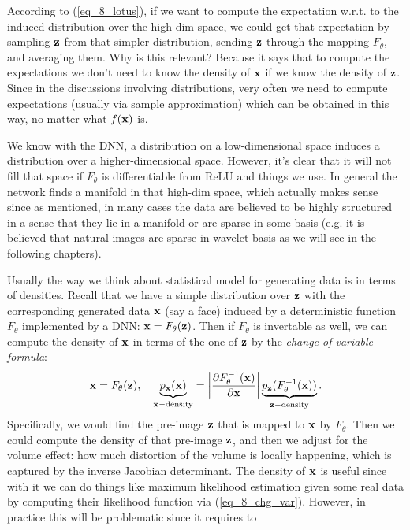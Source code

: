 \documentclass[../book-template.tex]{subfiles}
\begin{document}
According to (\ref{eq_8_lotus}), if we want to compute the expectation w.r.t. to the induced distribution over the high-dim space, we could get that expectation by sampling ${\bf z}$ from that simpler distribution, sending ${\bf z}$ through the mapping $F_{\theta}$, and averaging them. Why is this relevant? Because it says that to compute the expectations we don't need to know the density of ${\bf x}$ if we know the density of ${\bf z}$. Since in the discussions involving distributions, very often we need to compute expectations (usually via sample approximation) which can be obtained in this way, no matter what $f({\bf x})$ is.
\begin{remark}
	We know with the DNN, a distribution on a low-dimensional space induces a distribution over a higher-dimensional space. However, it's clear that it will not fill that space if $F_{\theta}$ is differentiable from ReLU and things we use. In general the network finds a manifold in that high-dim space, which actually makes sense since as mentioned, in many cases the data are believed to be highly structured in a sense that they lie in a manifold or are sparse in some basis (e.g. it is believed that natural images are sparse in wavelet basis as we will see in the following chapters). 
\end{remark}
\par Usually the way we think about statistical model for generating data is in terms of densities. Recall that we have a simple distribution over ${\bf z}$ with the corresponding generated data ${\bf x}$ (say a face) induced by a deterministic function $F_{\theta}$ implemented by a DNN: ${\bf x}=F_{\theta}({\bf z})$. Then if $F_{\theta}$ is invertable as well, we can compute the density of ${\bf x}$ in terms of the one of ${\bf z}$ by the \emph{change of variable formula}:
\begin{equation}\label{eq_8_chg_var}
	{\bf x}=F_{\theta}({\bf z}),\quad \underbrace{p_{\bf x}({\bf x})}_{{\bf x}-\text{density}}=\left|\frac{\partial F_{\theta}^{-1}({\bf x})}{\partial {\bf x}}\right|\underbrace{p_{\bf z}(F_{\theta}^{-1}({\bf x}))}_{{\bf z}-{\rm density}}.
\end{equation}
Specifically, we would find the pre-image ${\bf z}$ that is mapped to ${\bf x}$ by $F_{\theta}$. Then we could compute the density of that pre-image ${\bf z}$, and then we adjust for the volume effect: how much distortion of the volume is locally happening, which is captured by the inverse Jacobian determinant. The density of ${\bf x}$ is useful since with it we can do things like maximum likelihood estimation given some real data by computing their likelihood function via (\ref{eq_8_chg_var}). However, in practice this will be problematic since it requires to 
\end{document}
